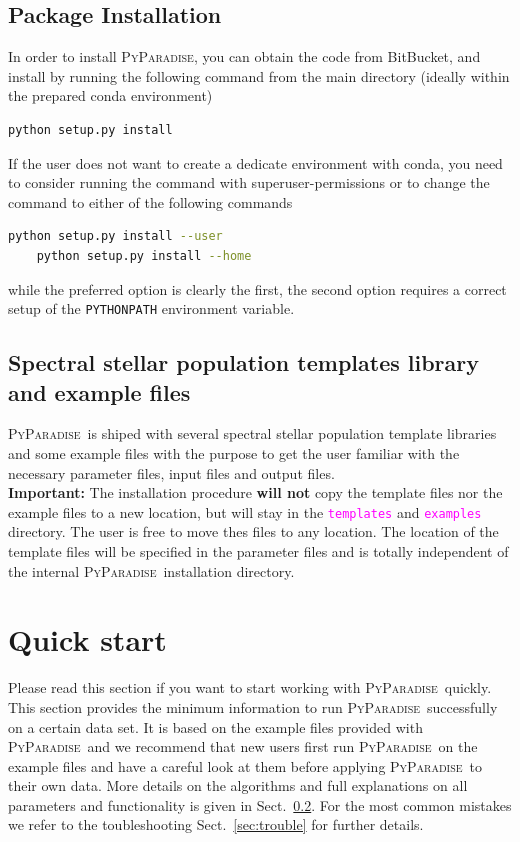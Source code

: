 \documentclass[usenatbib,usegraphicx,useAMS,onecolumn]{mn2e}
\newcommand{\codeline}[1]{\lstinline|#1|}
\newcommand{\fname}[1]{\textcolor{magenta}{\codeline{#1}}}
\newcommand{\PyPar}{\mbox{\textsc{PyParadise}}}
\begin{document}
\subsection{Package Installation}
In order to install \PyPar, you can obtain the code from BitBucket, and install by running the following command from the main directory (ideally within the prepared conda environment)
\begin{lstlisting}[language=sh]
    python setup.py install
\end{lstlisting}
If the user does not want to create a dedicate environment with conda, you need to consider running the command with superuser-permissions or to change the command to either of the following commands
\begin{lstlisting}[language=sh]
    python setup.py install --user
    python setup.py install --home
\end{lstlisting}
while the preferred option is clearly the first, the second option requires a correct setup of the \codeline{PYTHONPATH} environment variable.

\subsection{Spectral stellar population templates library and example files}
\PyPar\ is shiped with several spectral stellar population template libraries and some example files with the purpose to get the user familiar with the necessary parameter files, input files and output files. \bigskip\\
\textbf{Important:} The installation procedure \textbf{will not} copy the template files nor the example files to a new location, but will stay in the \fname{templates} and \fname{examples} directory. The user is free to move thes files to any location. The location of the template files will be specified in the parameter files and is totally independent of the internal \PyPar\ installation directory.

\section{Quick start}\label{sec:quickstart}
Please read this section if you want to start working with \PyPar\ quickly. This section provides the minimum information to run \PyPar\ successfully on a certain data set. It is based on the example files provided with \PyPar\ and we recommend that new users first run \PyPar\ on the example files and have a careful look at them before applying \PyPar\ to their own data. More details on the algorithms and full explanations on all parameters and functionality is given in Sect.~\ref{}. For the most common mistakes we refer to the toubleshooting Sect.~\ref{sec:trouble} for further details.
\end{document}
